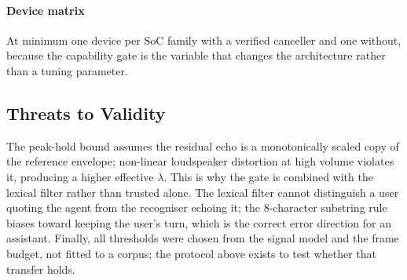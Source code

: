 \paragraph{Device matrix}
At minimum one device per SoC family with a verified canceller and one without,
because the capability gate is the variable that changes the architecture
rather than a tuning parameter.

\subsection{Threats to Validity}

The peak-hold bound assumes the residual echo is a monotonically scaled copy of
the reference envelope; non-linear loudspeaker distortion at high volume
violates it, producing a higher effective $\lambda$. This is why the gate is
combined with the lexical filter rather than trusted alone. The lexical filter
cannot distinguish a user quoting the agent from the recogniser echoing it;
the $8$-character substring rule biases toward keeping the user's turn, which is
the correct error direction for an assistant. Finally, all thresholds were
chosen from the signal model and the frame budget, not fitted to a corpus; the
protocol above exists to test whether that transfer holds.
